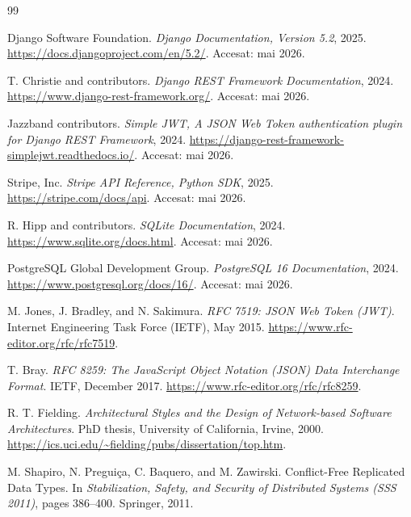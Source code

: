 \documentclass[12pt,a4paper]{report}
\begin{document}
\begin{thebibliography}{99}

Django Software Foundation.
\textit{Django Documentation, Version 5.2}, 2025.
\url{https://docs.djangoproject.com/en/5.2/}.
Accesat: mai 2026.

T. Christie and contributors.
\textit{Django REST Framework Documentation}, 2024.
\url{https://www.django-rest-framework.org/}.
Accesat: mai 2026.

Jazzband contributors.
\textit{Simple JWT, A JSON Web Token authentication plugin for Django REST Framework}, 2024.
\url{https://django-rest-framework-simplejwt.readthedocs.io/}.
Accesat: mai 2026.

Stripe, Inc.
\textit{Stripe API Reference, Python SDK}, 2025.
\url{https://stripe.com/docs/api}.
Accesat: mai 2026.

R. Hipp and contributors.
\textit{SQLite Documentation}, 2024.
\url{https://www.sqlite.org/docs.html}.
Accesat: mai 2026.

PostgreSQL Global Development Group.
\textit{PostgreSQL 16 Documentation}, 2024.
\url{https://www.postgresql.org/docs/16/}.
Accesat: mai 2026.

M. Jones, J. Bradley, and N. Sakimura.
\textit{RFC 7519: JSON Web Token (JWT)}.
Internet Engineering Task Force (IETF), May 2015.
\url{https://www.rfc-editor.org/rfc/rfc7519}.

T. Bray.
\textit{RFC 8259: The JavaScript Object Notation (JSON) Data Interchange Format}.
IETF, December 2017.
\url{https://www.rfc-editor.org/rfc/rfc8259}.

R. T. Fielding.
\textit{Architectural Styles and the Design of Network-based Software Architectures}.
PhD thesis, University of California, Irvine, 2000.
\url{https://ics.uci.edu/~fielding/pubs/dissertation/top.htm}.

M. Shapiro, N. Preguiça, C. Baquero, and M. Zawirski.
Conflict-Free Replicated Data Types.
In \textit{Stabilization, Safety, and Security of Distributed Systems (SSS 2011)},
pages 386--400. Springer, 2011.


\end{thebibliography}
\end{document}
